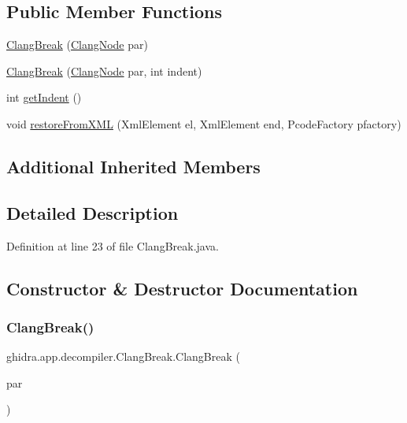 \subsection*{Public Member Functions}
\begin{DoxyCompactItemize}
\item 
\mbox{\hyperlink{classghidra_1_1app_1_1decompiler_1_1_clang_break_ad88ff8b76f00de1a70226739df35c2d9}{Clang\+Break}} (\mbox{\hyperlink{interfaceghidra_1_1app_1_1decompiler_1_1_clang_node}{Clang\+Node}} par)
\item 
\mbox{\hyperlink{classghidra_1_1app_1_1decompiler_1_1_clang_break_a5fa46af3e612f50739ceb071fcd7d3b9}{Clang\+Break}} (\mbox{\hyperlink{interfaceghidra_1_1app_1_1decompiler_1_1_clang_node}{Clang\+Node}} par, int indent)
\item 
int \mbox{\hyperlink{classghidra_1_1app_1_1decompiler_1_1_clang_break_a03b1a3db4c98f658cc5f4d6293d3292d}{get\+Indent}} ()
\item 
void \mbox{\hyperlink{classghidra_1_1app_1_1decompiler_1_1_clang_break_a4f89221822a1f22c24f3832466df5f69}{restore\+From\+X\+ML}} (Xml\+Element el, Xml\+Element end, Pcode\+Factory pfactory)
\end{DoxyCompactItemize}
\subsection*{Additional Inherited Members}


\subsection{Detailed Description}


Definition at line 23 of file Clang\+Break.\+java.



\subsection{Constructor \& Destructor Documentation}
\mbox{\label{classghidra_1_1app_1_1decompiler_1_1_clang_break_ad88ff8b76f00de1a70226739df35c2d9}} 
\subsubsection{\texorpdfstring{ClangBreak()}{ClangBreak()}\hspace{0.1cm}{\footnotesize\ttfamily [1/2]}}
{\footnotesize\ttfamily ghidra.\+app.\+decompiler.\+Clang\+Break.\+Clang\+Break (\begin{DoxyParamCaption}\item[{\mbox{\hyperlink{interfaceghidra_1_1app_1_1decompiler_1_1_clang_node}{Clang\+Node}}}]{par }\end{DoxyParamCaption})\hspace{0.3cm}{\ttfamily [inline]}}



